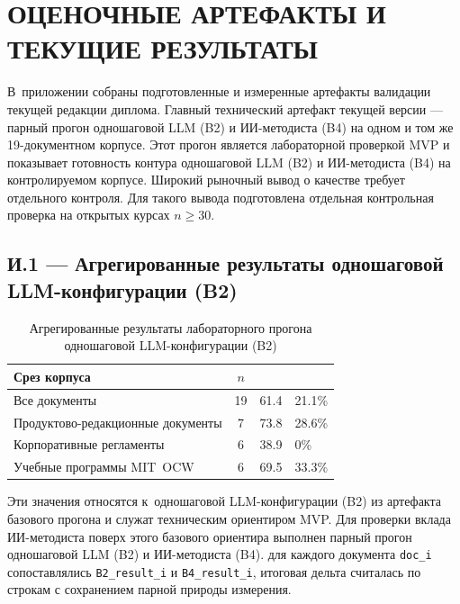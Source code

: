 \chapter{ОЦЕНОЧНЫЕ АРТЕФАКТЫ И ТЕКУЩИЕ РЕЗУЛЬТАТЫ}

В~приложении собраны подготовленные и измеренные артефакты валидации
текущей редакции диплома. Главный технический артефакт
текущей версии — парный прогон одношаговой LLM (B2) и ИИ-методиста (B4)
на одном и том же
19-документном корпусе.
Этот прогон является лабораторной проверкой MVP и показывает
готовность контура одношаговой LLM (B2) и ИИ-методиста (B4)
на контролируемом корпусе. Широкий рыночный вывод о качестве
требует отдельного контроля. Для такого вывода
подготовлена отдельная контрольная проверка на открытых курсах $n \geq 30$.

\section*{И.1 — Агрегированные результаты одношаговой LLM-конфигурации (B2)}

\begin{table}[H]
  \caption{Агрегированные результаты лабораторного прогона одношаговой LLM-конфигурации (B2)}
  \label{tab:appendix-b2}
  \centering
  \begingroup
  \small
  \setlength{\tabcolsep}{3pt}
  \renewcommand{\arraystretch}{1.12}
  \begin{tabular}{|P{4.5cm}|c|P{2.2cm}|P{2.5cm}|}
  \hline
  \textbf{Срез корпуса}
    & \textbf{$n$}
    & 
    &  \\
  \hline
  Все документы & 19 & 61.4 & 21.1\% \\
  \hline
  Продуктово-редакционные документы & 7 & 73.8 & 28.6\% \\
  \hline
  Корпоративные регламенты & 6 & 38.9 & 0\% \\
  \hline
  Учебные программы MIT~OCW & 6 & 69.5 & 33.3\% \\
  \hline
  \end{tabular}
  \endgroup
\end{table}

Эти значения относятся к~одношаговой LLM-конфигурации (B2) из артефакта
базового прогона и служат техническим
ориентиром MVP. Для проверки вклада ИИ-методиста поверх этого базового ориентира
выполнен парный прогон одношаговой LLM (B2) и ИИ-методиста (B4).
для каждого документа \texttt{doc\_i}
сопоставлялись \texttt{B2\_result\_i} и \texttt{B4\_result\_i},
итоговая дельта считалась по строкам с сохранением парной природы
измерения.


